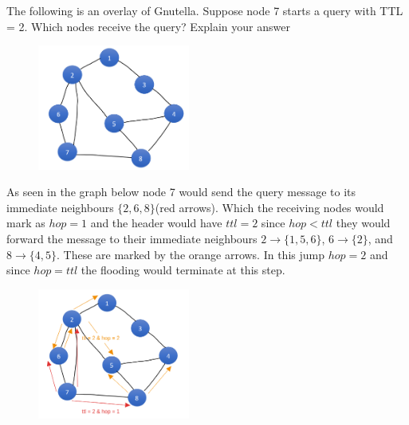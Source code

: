 \documentclass{article}
\begin{document}
\begin{tcolorbox}[colback=blue!5!white,colframe=blue!75!black,title=Question 3]
    The following is an overlay of Gnutella. Suppose node 7 starts a query with TTL = 2. Which nodes
    receive the query? Explain your answer
    \begin{figure}[H]
        \centering
        \includegraphics[width=5cm]{q3.png}
    \end{figure}
    \tcblower
    As seen in the graph below node 7 would send the query message to its immediate neighbours $\{ 2,6,8\}$(red arrows). 
    Which the receiving nodes would mark as $hop = 1$ and the header would have $ttl = 2$ since $hop < ttl$ they would
    forward the message to their immediate neighbours $2 \rightarrow \{1,5,6\}$, $6 \rightarrow \{2\}$,
    and $8 \rightarrow \{4,5\}$. These are marked by the orange arrows. In this jump $hop = 2$ and since $hop = ttl$ the flooding would terminate at this step.
    \begin{figure}[H]
        \centering
        \includegraphics[width=5cm]{q3_answer.png}
    \end{figure}

\end{tcolorbox}
\end{document}
